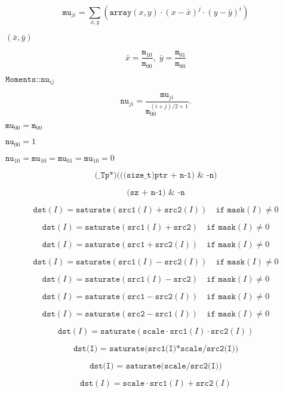 \documentclass{article}
\begin{document}
\[\texttt{mu} _{ji}= \sum _{x,y} \left ( \texttt{array} (x,y) \cdot (x - \bar{x} )^j \cdot (y - \bar{y} )^i \right )\]
\pagebreak

$(\bar{x}, \bar{y})$
\pagebreak

\[\bar{x} = \frac{\texttt{m}_{10}}{\texttt{m}_{00}} , \; \bar{y} = \frac{\texttt{m}_{01}}{\texttt{m}_{00}}\]
\pagebreak

$\texttt{Moments::nu}_{ij}$
\pagebreak

\[\texttt{nu} _{ji}= \frac{\texttt{mu}_{ji}}{\texttt{m}_{00}^{(i+j)/2+1}} .\]
\pagebreak

$\texttt{mu}_{00}=\texttt{m}_{00}$
\pagebreak

$\texttt{nu}_{00}=1$
\pagebreak

$\texttt{nu}_{10}=\texttt{mu}_{10}=\texttt{mu}_{01}=\texttt{mu}_{10}=0$
\pagebreak

\[\texttt{(_Tp*)(((size_t)ptr + n-1) & -n)}\]
\pagebreak

\[\texttt{(sz + n-1) & -n}\]
\pagebreak

\[\texttt{dst}(I) = \texttt{saturate} ( \texttt{src1}(I) + \texttt{src2}(I)) \quad \texttt{if mask}(I) \ne0\]
\pagebreak

\[\texttt{dst}(I) = \texttt{saturate} ( \texttt{src1}(I) + \texttt{src2} ) \quad \texttt{if mask}(I) \ne0\]
\pagebreak

\[\texttt{dst}(I) = \texttt{saturate} ( \texttt{src1} + \texttt{src2}(I) ) \quad \texttt{if mask}(I) \ne0\]
\pagebreak

\[\texttt{dst}(I) = \texttt{saturate} ( \texttt{src1}(I) - \texttt{src2}(I)) \quad \texttt{if mask}(I) \ne0\]
\pagebreak

\[\texttt{dst}(I) = \texttt{saturate} ( \texttt{src1}(I) - \texttt{src2} ) \quad \texttt{if mask}(I) \ne0\]
\pagebreak

\[\texttt{dst}(I) = \texttt{saturate} ( \texttt{src1} - \texttt{src2}(I) ) \quad \texttt{if mask}(I) \ne0\]
\pagebreak

\[\texttt{dst}(I) = \texttt{saturate} ( \texttt{src2} - \texttt{src1}(I) ) \quad \texttt{if mask}(I) \ne0\]
\pagebreak

\[\texttt{dst} (I)= \texttt{saturate} ( \texttt{scale} \cdot \texttt{src1} (I) \cdot \texttt{src2} (I))\]
\pagebreak

\[\texttt{dst(I) = saturate(src1(I)*scale/src2(I))}\]
\pagebreak

\[\texttt{dst(I) = saturate(scale/src2(I))}\]
\pagebreak

\[\texttt{dst} (I)= \texttt{scale} \cdot \texttt{src1} (I) + \texttt{src2} (I)\]
\pagebreak
\end{document}

